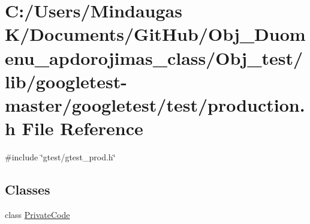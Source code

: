 \hypertarget{_obj__test_2lib_2googletest-master_2googletest_2test_2production_8h}{}\section{C\+:/\+Users/\+Mindaugas K/\+Documents/\+Git\+Hub/\+Obj\+\_\+\+Duomenu\+\_\+apdorojimas\+\_\+class/\+Obj\+\_\+test/lib/googletest-\/master/googletest/test/production.h File Reference}
\label{_obj__test_2lib_2googletest-master_2googletest_2test_2production_8h}
{\ttfamily \#include \char`\"{}gtest/gtest\+\_\+prod.\+h\char`\"{}}\newline
\subsection*{Classes}
\begin{DoxyCompactItemize}
\item 
class \mbox{\hyperlink{class_private_code}{Private\+Code}}
\end{DoxyCompactItemize}
